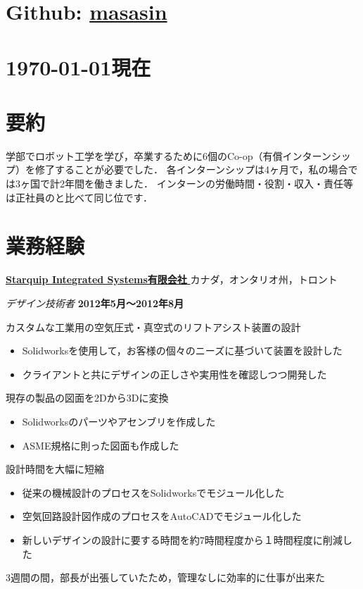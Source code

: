 \documentclass[10pt, a4paper]{article}
\def\xeCJKembold{0.15}
\def\saveCJKnode{\dimen255\lastkern}
\def\restoreCJKnode{\kern-\dimen255\kern\dimen255}
\let\CJKoldsymbol\CJKsymbol
\let\CJKoldpunctsymbol\CJKpunctsymbol
\def\CJKfakeboldsymbol#1{%
\special{pdf:literal direct 2 Tr \xeCJKembold\space w}%
\CJKoldsymbol{#1}%
\saveCJKnode
\special{pdf:literal direct 0 Tr}%
\restoreCJKnode}
\def\CJKfakeboldpunctsymbol#1{%
\special{pdf:literal direct 2 Tr \xeCJKembold\space w}%
\CJKoldpunctsymbol{#1}%
\saveCJKnode
\special{pdf:literal direct 0 Tr}%
\restoreCJKnode}
\newcommand\CJKfakebold[1]{%
\let\CJKsymbol\CJKfakeboldsymbol
\let\CJKpunctsymbol\CJKfakeboldpunctsymbol
#1%
\let\CJKsymbol\CJKoldsymbol
\let\CJKpunctsymbol\CJKoldpunctsymbol}
\begin{document}
\thispagestyle{plain}

\section{\footnotesize Github: \href{https://github.com/masasin}{masasin}}
\section{\footnotesize{\today 現在}}

\section{要約}
学部でロボット工学を学び，卒業するために6個のCo-op（有償インターンシップ）を修了することが必要でした．
各インターンシップは4ヶ月で，私の場合では3ヶ国で計2年間を働きました．
インターンの労働時間・役割・収入・責任等は正社員のと比べて同じ位です．

\section{業務経験}
\href{http://starquip.com/}{\CJKfakebold{\textbf{Starquip Integrated Systems有限会社}}}\hfill カナダ，オンタリオ州，トロント

\begin{outerlist}
\item[] \textit{デザイン技術者} \hfill \textbf{2012年5月〜2012年8月}
  \begin{innerlist}
  \item カスタムな工業用の空気圧式・真空式のリフトアシスト装置の設計
  \begin{itemize}
    \item Solidworksを使用して，お客様の個々のニーズに基づいて装置を設計した
    \item クライアントと共にデザインの正しさや実用性を確認しつつ開発した
  \end{itemize}
  \item 現存の製品の図面を2Dから3Dに変換
  \begin{itemize}
    \item Solidworksのパーツやアセンブリを作成した
    \item ASME規格に則った図面も作成した
  \end{itemize}
  \item 設計時間を大幅に短縮
  \begin{itemize}
    \item 従来の機械設計のプロセスをSolidworksでモジュール化した
    \item 空気回路設計図作成のプロセスをAutoCADでモジュール化した
    \item 新しいデザインの設計に要する時間を約7時間程度から１時間程度に削減した
  \end{itemize}
  \item 3週間の間，部長が出張していたため，管理なしに効率的に仕事が出来た
  \end{innerlist}
\end{outerlist}
\end{document}
